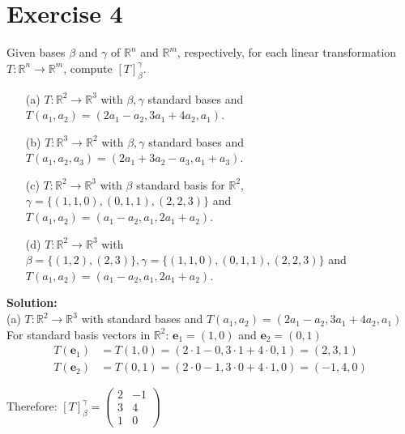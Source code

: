 \documentclass{article}
\begin{document}
\newpage

\section*{Exercise 4}
Given bases $\beta$ and $\gamma$ of $\mathbb{R}^n$ and $\mathbb{R}^m$, respectively, for each linear transformation $T : \mathbb{R}^n \to \mathbb{R}^m$, compute $[T]_{\beta}^{\gamma}$.

\begin{itemize}
    \item[(a)] $T : \mathbb{R}^2 \to \mathbb{R}^3$ with $\beta, \gamma$ standard bases and $T(a_1, a_2) = (2a_1 - a_2, 3a_1 + 4a_2, a_1)$.

    \item[(b)] $T : \mathbb{R}^3 \to \mathbb{R}^2$ with $\beta, \gamma$ standard bases and $T(a_1, a_2, a_3) = (2a_1 + 3a_2 - a_3, a_1 + a_3)$.

    \item[(c)] $T : \mathbb{R}^2 \to \mathbb{R}^3$ with $\beta$ standard basis for $\mathbb{R}^2$, $\gamma = \{(1,1,0),(0,1,1),(2,2,3)\}$ and $T(a_1, a_2) = (a_1 - a_2, a_1, 2a_1 + a_2)$.

    \item[(d)] $T : \mathbb{R}^2 \to \mathbb{R}^3$ with $\beta = \{(1,2),(2,3)\}, \gamma = \{(1,1,0),(0,1,1),(2,2,3)\}$ and $T(a_1, a_2) = (a_1 - a_2, a_1, 2a_1 + a_2)$.
\end{itemize}

\textbf{Solution: }\\

(a) $T : \mathbb{R}^2 \to \mathbb{R}^3$ with standard bases and $T(a_1, a_2) = (2a_1 - a_2, 3a_1 + 4a_2, a_1)$ \\

For standard basis vectors in $\mathbb{R}^2$: $\mathbf{e}_1 = (1,0)$ and $\mathbf{e}_2 = (0,1)$
\begin{align*}
T(\mathbf{e}_1) &= T(1,0) = (2 \cdot 1 - 0, 3 \cdot 1 + 4 \cdot 0, 1) = (2, 3, 1)\\
T(\mathbf{e}_2) &= T(0,1) = (2 \cdot 0 - 1, 3 \cdot 0 + 4 \cdot 1, 0) = (-1, 4, 0)
\end{align*}

Therefore:
$[T]_\beta^\gamma = \begin{pmatrix} 
2 & -1 \\ 
3 & 4 \\ 
1 & 0 
\end{pmatrix}$ \\
\end{document}

